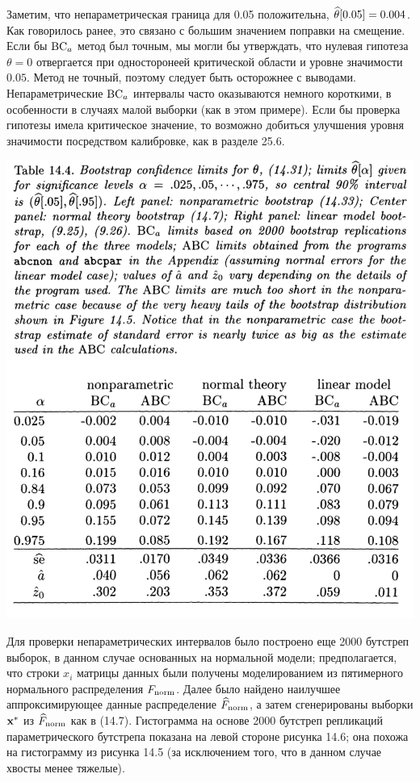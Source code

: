 Заметим, что непараметрическая граница для 0.05 положительна, $\widehat{\theta}[0.05] = 0.004$. Как говорилось ранее, это связано с большим значением поправки на смещение. Если бы $\mathrm{BC}_a$ метод был точным, мы могли бы утверждать, что нулевая гипотеза $\theta = 0$ отвергается при односторонеей критической области и уровне значимости $0.05$. Метод не точный, поэтому следует быть осторожнее с выводами. Непараметрические $\mathrm{BC}_a$ интервалы часто оказываются немного короткими, в особенности в случаях малой выборки (как в этом примере). Если бы проверка гипотезы имела критическое значение, то возможно добиться улучшения уровня значимости посредством калибровке, как в разделе 25.6.

\noindent
\begin{center}
\includegraphics[width=0.9\linewidth]{14/t144.png}
\end{center}
\setcounter{table}{3}

Для проверки непараметрических интервалов было построено еще 2000 бутстреп выборок, в данном случае основанных на нормальной модели; предполагается, что строки $x_i$ матрицы данных были получены моделированием из пятимерного нормального распределения $F_{\text{norm}}$. Далее было найдено наилучшее аппроксимирующее данные распределение $\widehat{F}_{\text{norm}}$, а затем сгенерированы выборки $\mathbf x^*$ из $\widehat{F}_{\text{norm}}$ как в (14.7). Гистограмма на основе 2000 бутстреп репликаций параметрического бутстрепа показана на левой стороне рисунка 14.6; она похожа на гистограмму из рисунка 14.5 (за исключением того, что в данном случае хвосты менее тяжелые).

